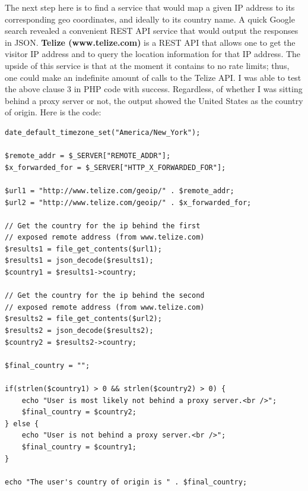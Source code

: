 \documentclass[12pt]{article}
\begin{document}
The next step here is to find a service that would map a given IP address to its corresponding geo coordinates, and ideally to its country name. A quick Google search revealed a convenient REST API service that would output the responses in JSON. \textbf{Telize (www.telize.com)} is a REST API that allows one to get the visitor IP address and to query the location information for that IP address. The upside of this service is that at the moment it contains to no rate limits; thus, one could make an indefinite amount of calls to the Telize API. I was able to test the above clause 3 in PHP code with success. Regardless, of whether I was sitting behind a proxy server or not, the output showed the United States as the country of origin. Here is the code:
\begin{lstlisting}
date_default_timezone_set("America/New_York");

$remote_addr = $_SERVER["REMOTE_ADDR"];
$x_forwarded_for = $_SERVER["HTTP_X_FORWARDED_FOR"];

$url1 = "http://www.telize.com/geoip/" . $remote_addr; 
$url2 = "http://www.telize.com/geoip/" . $x_forwarded_for; 

// Get the country for the ip behind the first
// exposed remote address (from www.telize.com)
$results1 = file_get_contents($url1);
$results1 = json_decode($results1);
$country1 = $results1->country;

// Get the country for the ip behind the second
// exposed remote address (from www.telize.com)
$results2 = file_get_contents($url2);
$results2 = json_decode($results2);
$country2 = $results2->country;

$final_country = "";

if(strlen($country1) > 0 && strlen($country2) > 0) {
	echo "User is most likely not behind a proxy server.<br />"; 
	$final_country = $country2;
} else {
	echo "User is not behind a proxy server.<br />";
	$final_country = $country1;
}

echo "The user's country of origin is " . $final_country;
\end{lstlisting}   

\vfill
\end{document}

